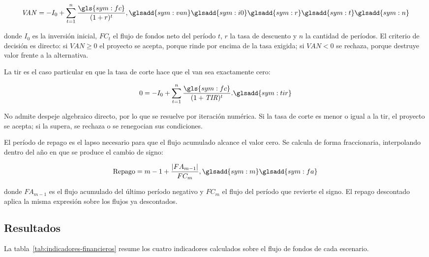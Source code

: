 \begin{equation}
    \mathit{VAN} = -I_0 + \sum_{t=1}^{n} \frac{\gls{sym:fc}}{(1 + r)^{t}},
    \glsadd{sym:van}\glsadd{sym:i0}\glsadd{sym:r}\glsadd{sym:t}\glsadd{sym:n}%
    \label{eq:van}
\end{equation}

donde $I_0$ es la inversión inicial, $FC_t$ el flujo de fondos neto del
período $t$, $r$ la tasa de descuento y $n$ la cantidad de períodos. El
criterio de decisión es directo: si $\mathit{VAN} \geq 0$ el proyecto se
acepta, porque rinde por encima de la tasa exigida; si
$\mathit{VAN} < 0$ se rechaza, porque destruye valor frente a la
alternativa.

La \gls{tir} es el caso particular en que la tasa de corte hace que el
\gls{van} sea exactamente cero:

\begin{equation}
    0 = -I_0 + \sum_{t=1}^{n} \frac{\gls{sym:fc}}{(1 + \mathit{TIR})^{t}}.
    \glsadd{sym:tir}%
    \label{eq:tir}
\end{equation}

No admite despeje algebraico directo, por lo que se resuelve por
iteración numérica. Si la tasa de corte es menor o igual a la \gls{tir},
el proyecto se acepta; si la supera, se rechaza o se renegocian sus
condiciones.

El período de repago es el lapso necesario para que el flujo acumulado
alcance el valor cero. Se calcula de forma fraccionaria, interpolando
dentro del año en que se produce el cambio de signo:

\begin{equation}
    \text{Repago} = m - 1 + \frac{\left| FA_{m-1} \right|}{FC_{m}},
    \glsadd{sym:m}\glsadd{sym:fa}%
    \label{eq:repago}
\end{equation}

donde $FA_{m-1}$ es el flujo acumulado del último período negativo y
$FC_m$ el flujo del período que revierte el signo. El repago descontado
aplica la misma expresión sobre los flujos ya descontados.

\subsection{Resultados}

La tabla~\ref{tab:indicadores-financieros} resume los cuatro indicadores
calculados sobre el flujo de fondos de cada escenario.

